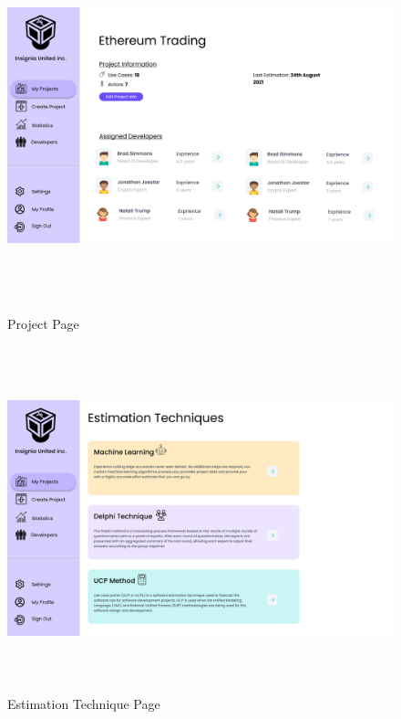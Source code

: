 \begin{figure}[H]
\includegraphics[height=10cm, width=1\textwidth]{./images/prototype/0004}
\centering 
\caption{Project Page}
\label{fig:prototype1}

\includegraphics[height=10cm, width=1\textwidth]{./images/prototype/0011}
\centering 
\caption{Estimation Technique Page}
\label{fig:prototype1}
\end{figure}

